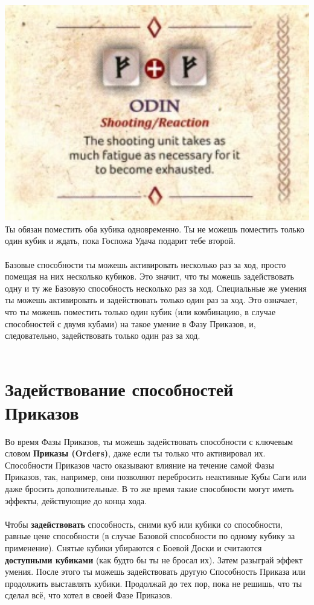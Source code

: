 \documentclass[a4paper,11pt,twoside]{article}
\begin{document}
\includegraphics[width=1.0\textwidth]{pics/SagaMultipleDiceAbility} \\
Ты обязан поместить оба кубика одновременно. Ты не можешь поместить только один кубик и ждать, пока Госпожа Удача подарит тебе второй. \\ \\ 
Базовые способности ты можешь активировать несколько раз за ход, просто помещая на них несколько кубиков. Это значит, что ты можешь задействовать одну и ту же Базовую способность несколько раз за ход. Специальные же умения ты можешь активировать и задействовать только один раз за ход. Это означает, что ты можешь поместить только один кубик (или комбинацию, в случае способностей с двумя кубами) на такое умение в Фазу Приказов, и, следовательно, задействовать только один раз за ход. \\ \\
\section*{Задействование способностей Приказов}
Во время Фазы Приказов, ты можешь задействовать способности с ключевым словом \textbf{Приказы (Orders)}, даже если ты только что активировал их. Способности Приказов часто оказывают влияние на течение самой Фазы Приказов, так, например, они позволяют перебросить неактивные Кубы Саги или даже бросить дополнительные. В то же время такие способности могут иметь эффекты, действующие до конца хода. \\ \\
Чтобы \textbf{задействовать} способность, сними куб или кубики со способности, равные цене способности (в случае Базовой способности по одному кубику за применение). Снятые кубики убираются с Боевой Доски и считаются \textbf{доступными кубиками} (как будто бы ты не бросал их). Затем разыграй эффект умения. После этого ты можешь задействовать другую Способность Приказа или продолжить выставлять кубики. Продолжай до тех пор, пока не решишь, что ты сделал всё, что хотел в своей Фазе Приказов. \\ \\ 
\end{document}
